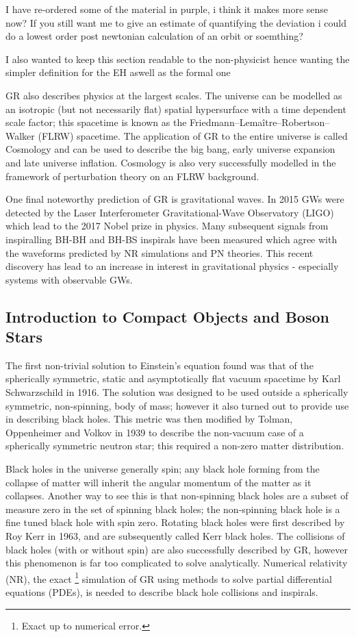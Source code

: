 \color{choral} I have re-ordered some of the material in purple, i think it makes more sense now? If you still want me to give an estimate of quantifying the deviation i could do a lowest order post newtonian calculation of an orbit or soemthing?  

I also wanted to keep this section readable to the non-physicist hence wanting the simpler definition for the EH aswell as the formal one
\color{black}

GR also describes physics at the largest scales. The universe can be modelled as an isotropic (but not necessarily flat) spatial hypersurface with a time dependent scale factor; this spacetime is known as the Friedmann–Lemaître–Robertson–Walker (FLRW) spacetime. The application of GR to the entire universe is called Cosmology and can be used to describe the big bang, early universe expansion and late universe inflation. Cosmology is also very successfully modelled in the framework of perturbation theory on an FLRW background.

One final noteworthy prediction of GR is gravitational waves. In 2015 GWs were detected by the Laser Interferometer Gravitational-Wave Observatory (LIGO) which lead to the 2017 Nobel prize in physics. Many subsequent signals from inspiralling BH-BH and BH-BS inspirals have been measured which agree with the waveforms predicted by NR simulations and PN theories. This recent discovery has lead to an increase in interest in gravitational physics - especially systems with observable GWs.



\subsection{Introduction to Compact Objects and Boson Stars}
The first non-trivial solution to Einstein's equation found was that of the spherically symmetric, static and asymptotically flat vacuum spacetime by Karl Schwarzschild in 1916. The solution was designed to be used outside a spherically symmetric, non-spinning, body of mass; however it also turned out to provide use in describing black holes. This metric was then modified by Tolman, Oppenheimer and Volkov in 1939 to describe the non-vacuum case of a spherically symmetric neutron star; this required a non-zero matter distribution. 

Black holes in the universe generally spin; any black hole forming from the collapse of matter will inherit the angular momentum of the matter as it collapses. Another way to see this is that non-spinning black holes are a subset of measure zero in the set of spinning black holes; the non-spinning black hole is a fine tuned black hole with spin zero. Rotating black holes were first described by Roy Kerr in 1963, and are subsequently called Kerr black holes. The collisions of black holes (with or without spin) {\color{orchid} are} also successfully described by GR, however this phenomenon is far too complicated to solve analytically. Numerical relativity (NR), the exact{ \color{orchid} \footnote{\color{orchid} Exact up to numerical error.} } simulation of GR using methods to solve partial differential equations (PDEs), is needed to describe black hole collisions and inspirals. 

